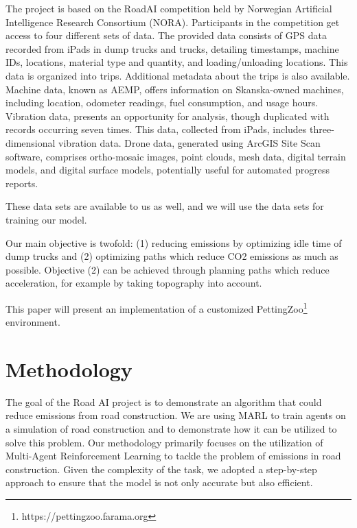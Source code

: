 \documentclass[conference]{IEEEtran}
\begin{document}
The project is based on the RoadAI competition held by Norwegian Artificial Intelligence Research
Consortium (NORA)\cite{noraRoadAIReducing}. Participants in the competition get access to four
different sets of data. The provided data consists of GPS data recorded from iPads in dump trucks and
trucks, detailing timestamps, machine IDs, locations, material type and quantity, and loading/unloading
locations. This data is organized into trips. Additional metadata about the trips is also available.
Machine data, known as AEMP, offers information on Skanska-owned machines, including location,
odometer readings, fuel consumption, and usage hours. Vibration data, presents an opportunity for analysis, though duplicated with records occurring seven times. This data, collected from
iPads, includes three-dimensional vibration data. Drone data, generated using ArcGIS Site Scan software,
comprises ortho-mosaic images, point clouds, mesh data, digital terrain models, and digital surface models,
potentially useful for automated progress reports.

These data sets are available to us as well, and we will use the data sets for training our model.

Our main objective is twofold: (1) reducing emissions by optimizing idle time of dump trucks and (2)
optimizing paths which reduce CO2 emissions as much as possible. Objective (2) can be achieved through
planning paths which reduce acceleration, for example by taking topography into account.

This paper will present an implementation of a customized PettingZoo\footnote{https://pettingzoo.farama.org}
environment.


\section{Methodology}

The goal of the Road AI project is to demonstrate an algorithm that could reduce emissions from road construction.
We are using MARL to train agents on a simulation of road construction and to demonstrate how it can be utilized to solve this problem.
Our methodology primarily focuses on the utilization of Multi-Agent Reinforcement Learning to tackle the problem of emissions in road construction. Given the complexity of the task, we adopted a step-by-step approach to ensure that the model is not only accurate but also efficient.
\end{document}
